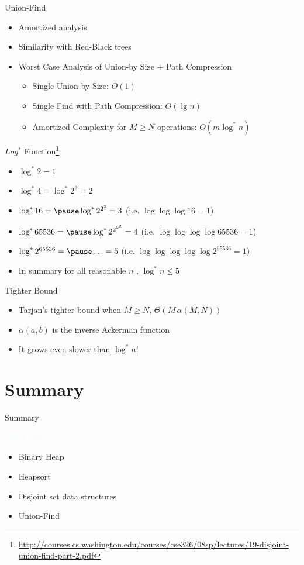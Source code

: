 \documentclass{beamer}
\newcommand{\tblue}[1]{{\Large {\textcolor{azure}{#1}}}}
\begin{document}
\begin{frame}{Union-Find}
    \begin{itemize}
        \item Amortized analysis
        \item Similarity with Red-Black trees
        \item Worst Case Analysis of Union-by Size + Path Compression
        \begin{itemize}
            \item Single Union-by-Size: $O(1)$
            \item Single Find with Path Compression: $O(\lg n)$
            \item Amortized Complexity for $M \geq N$ operations: $O(m \log^{*} n)$
        \end{itemize}
    \end{itemize}
\end{frame}

\begin{frame}{$Log^{*}$ Function\footnote{\url{http://courses.cs.washington.edu/courses/cse326/08sp/lectures/19-disjoint-union-find-part-2.pdf}}}
    \begin{itemize}
        \item $\log^{*} 2 = 1$
        \item $\log^{*} 4 = \log^{*} 2^2 = 2$
        \item $\log^{*} 16 = \pause \log^{*} 2^{2^{2}} = 3$ (i.e. $\log \log \log 16 = 1$)
        \item $\log^{*} 65536 = \pause \log^{*} 2^{2^{2^{2}}} = 4$ (i.e. $\log \log \log \log 65536 = 1$)
        \item $\log^{*} 2^{65536} = \pause \ldots = 5$ (i.e. $\log \log \log \log \log 2^{65536} = 1$)
        \item In summary for all reasonable $n$ , $\log^{*} n \leq 5 $
    \end{itemize}
\end{frame}


\begin{frame}{Tighter Bound}
    \begin{itemize}
        \item Tarjan's tighter bound when $M \geq N$, $\Theta( M \, \alpha(M, N))$
        \item $\alpha(a,b)$ is the inverse Ackerman function
        \item It grows even slower than $\log^{*} n$!
    \end{itemize}
\end{frame}

\section{Summary}

\begin{frame}{Summary}

\tblue{Major Concepts:}
\begin{itemize}
\item Binary Heap
\item Heapsort
\item Disjoint set data structures
\item Union-Find
\end{itemize}
\end{frame}
\end{document}
